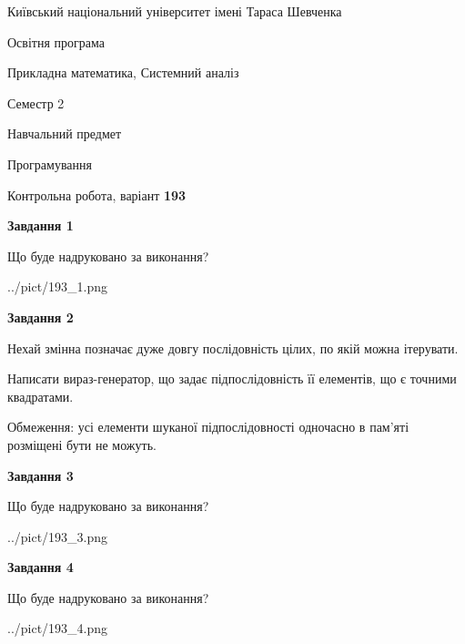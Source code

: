 \documentclass[12pt, ukrainian]{article}
\begin{document}
{{\begin {small}\par
{ \center  Київський національний університет імені Тараса Шевченка \par}
{\parbox {5 cm}{Освітня програма \hfill}{\parbox {8 cm}{Прикладна математика, Системний аналіз \hfill}}\parbox {5 cm}{\hfill Семестр 2}}\par
{\parbox {5 cm} {Навчальний предмет \hfill}\parbox {7 cm}{Програмування \hfill}\parbox {6cm}{\hfill}\par}\vspace{-7pt} \end{small}}{\center Контрольна робота, варіант  \No \textbf
{ 193 }\par}}
{
\begin {large}
{\begin {center}\textbf{Завдання 1}\end {center}}\par
Що буде надруковано за виконання?\par\par
\begin{center}
	{../pict/193_1.png}
\end{center}
\newpage

{\begin {center}\textbf{Завдання 2}\end {center}}\par
Нехай змінна  позначає дуже довгу послідовність цілих, по якій можна ітерувати.

Написати вираз-генератор, що задає підпослідовність її елементів, що є точними квадратами.

Обмеження: усі елементи шуканої підпослідовності одночасно в пам'яті розміщені бути не можуть.\par
\newpage

{\begin {center}\textbf{Завдання 3}\end {center}}\par
Що буде надруковано за виконання?\par
\begin{center}
	{../pict/193_3.png}
\end{center}
\newpage

{\begin {center}\textbf{Завдання 4}\end {center}}\par
Що буде надруковано за виконання?\par
\begin{center}
	{../pict/193_4.png}
\end{center}
\newpage


\end{large}}
\end{document}
